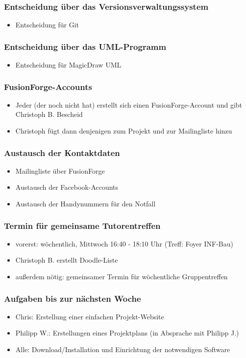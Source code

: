 \documentclass[12pt,a4paper]{article}
\begin{document}
\subsubsection*{Entscheidung über das Versionsverwaltungssystem}
\begin{itemize}
\item Entscheidung für Git
\end{itemize}

\subsubsection*{Entscheidung über das UML-Programm}
\begin{itemize}
\item Entscheidung für MagicDraw UML
\end{itemize}

\subsubsection*{FusionForge-Accounts}
\begin{itemize}
\item Jeder (der noch nicht hat) erstellt sich einen FusionForge-Account und gibt Christoph B. Bescheid
\item Christoph fügt dann denjenigen zum Projekt und zur Mailingliste hinzu
\end{itemize}

\subsubsection*{Austausch der Kontaktdaten}
\begin{itemize}
\item Mailingliste über FusionForge
\item Austausch der Facebook-Accounts
\item Austausch der Handynummern für den Notfall
\end{itemize}

\subsubsection*{Termin für gemeinsame Tutorentreffen}
\begin{itemize}
\item vorerst: wöchentlich, Mittwoch 16:40 - 18:10 Uhr (Treff: Foyer INF-Bau)
\item Christoph B. erstellt Doodle-Liste 
\item außerdem nötig: gemeinsamer Termin für wöchentliche Gruppentreffen
\end{itemize}

\subsubsection*{Aufgaben bis zur nächsten Woche}
\begin{itemize}
\item Chris: Erstellung einer einfachen Projekt-Website
\item Philipp W.: Erstellungen eines Projektplans (in Absprache mit Philipp J.)
\item Alle: Download/Installation und Einrichtung der notwendigen Software
\end{itemize}
\end{document}
